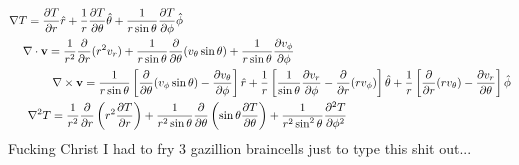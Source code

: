 \documentclass[12pt]{article}
\begin{document}
\begin{align}
    \nabla T = \frac{\partial T}{\partial r}\hat{r}+\frac{1}{r}\frac{\partial T}{\partial \theta}\hat{\theta}+\frac{1}{r\sin\theta}\frac{\partial T}{\partial \phi}\hat{\phi} \hspace{10cm} \\
    \nabla \cdot \mathbf{v} = \frac{1}{r^2}\frac{\partial}{\partial r}(r^2v_r)+\frac{1}{r\sin\theta}\frac{\partial}{\partial \theta}(v_{\theta}\sin\theta)+\frac{1}{r\sin\theta}\frac{\partial v_{\phi}}{\partial\phi}\hspace{6.6cm} \\
    \nabla \times \mathbf{v} = \frac{1}{r\sin\theta}\left[\frac{\partial}{\partial \theta}(v_{\phi}\sin\theta)-\frac{\partial v_{\theta}}{\partial \phi}\right]\hat{r}+\frac{1}{r}\left[\frac{1}{\sin\theta}\frac{\partial v_r}{\partial \phi}-\frac{\partial}{\partial r}(rv_{\phi})\right]\hat{\theta} + \frac{1}{r}\left[\frac{\partial}{\partial r}(rv_{\theta})-\frac{\partial v_r}{\partial\theta}\right]\hat{\phi} \\
    \nabla^2T=\frac{1}{r^2}\frac{\partial}{\partial r}\left(r^2 \frac{\partial T}{\partial r}\right)+\frac{1}{r^2 \sin\theta}\frac{\partial}{\partial\theta}\left(\sin\theta \frac{\partial T}{\partial \theta}\right)+\frac{1}{r^2\sin^2\theta}\frac{\partial^2T}{\partial\phi^2} \hspace{5cm}
\end{align}
Fucking Christ I had to fry 3 gazillion braincells just to type this shit out...
\end{document}
